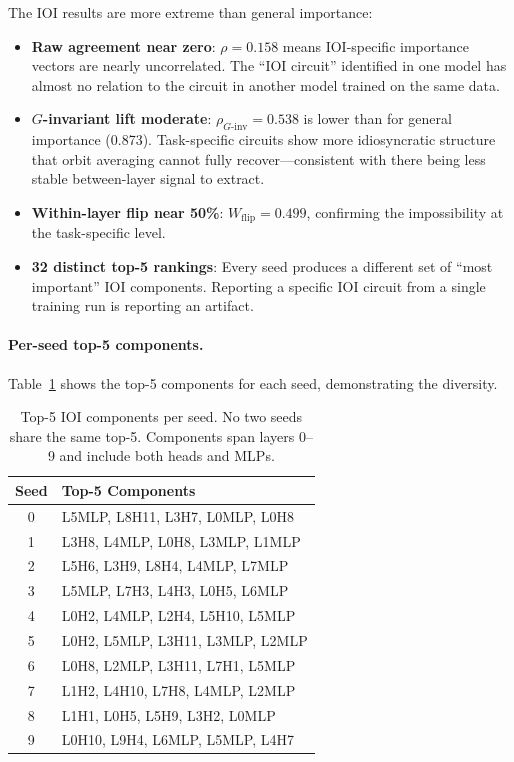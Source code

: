 \documentclass{article}
\begin{document}
The IOI results are more extreme than general importance:
\begin{itemize}
  \item \textbf{Raw agreement near zero}: $\rho = 0.158$ means IOI-specific importance vectors are nearly uncorrelated. The ``IOI circuit'' identified in one model has almost no relation to the circuit in another model trained on the same data.
  \item \textbf{$G$-invariant lift moderate}: $\rho_{G\text{-inv}} = 0.538$ is lower than for general importance (0.873). Task-specific circuits show more idiosyncratic structure that orbit averaging cannot fully recover---consistent with there being less stable between-layer signal to extract.
  \item \textbf{Within-layer flip near 50\%}: $W_{\text{flip}} = 0.499$, confirming the impossibility at the task-specific level.
  \item \textbf{32 distinct top-5 rankings}: Every seed produces a different set of ``most important'' IOI components. Reporting a specific IOI circuit from a single training run is reporting an artifact.
\end{itemize}

\paragraph{Per-seed top-5 components.}
Table~\ref{tab:ioi-top5} shows the top-5 components for each seed, demonstrating the diversity.

\begin{table}[ht]
\centering
\caption{Top-5 IOI components per seed. No two seeds share the same top-5. Components span layers 0--9 and include both heads and MLPs.}
\label{tab:ioi-top5}
\small
\begin{tabular}{cl}
\toprule
\textbf{Seed} & \textbf{Top-5 Components} \\
\midrule
0 & L5MLP, L8H11, L3H7, L0MLP, L0H8 \\
1 & L3H8, L4MLP, L0H8, L3MLP, L1MLP \\
2 & L5H6, L3H9, L8H4, L4MLP, L7MLP \\
3 & L5MLP, L7H3, L4H3, L0H5, L6MLP \\
4 & L0H2, L4MLP, L2H4, L5H10, L5MLP \\
5 & L0H2, L5MLP, L3H11, L3MLP, L2MLP \\
6 & L0H8, L2MLP, L3H11, L7H1, L5MLP \\
7 & L1H2, L4H10, L7H8, L4MLP, L2MLP \\
8 & L1H1, L0H5, L5H9, L3H2, L0MLP \\
9 & L0H10, L9H4, L6MLP, L5MLP, L4H7 \\
\bottomrule
\end{tabular}
\end{table}
\end{document}
